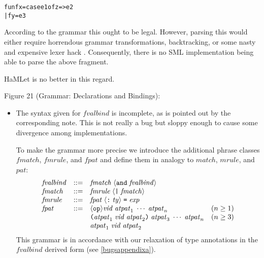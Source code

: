 \documentclass[twoside,titlepage]{article}
\begin{document}
\begin{appendix}
\begin{itemize}
\begin{quoting}
\begin{alltt}
fun f x = case e1 of z => e2
  | f y = e3
\end{alltt}
\end{quoting}

According to the grammar this ought to be legal. However, parsing this would either require horrendous grammar transformations, backtracking, or some nasty and expensive lexer hack \cite{mistakes}. Consequently, there is no SML implementation being able to parse the above fragment.

HaMLet is no better in this regard.
\end{itemize}


Figure 21 (Grammar: Declarations and Bindings):

\begin{itemize}
\item The syntax given for $\mathit{fvalbind}$ is incomplete, as is pointed out by the corresponding note. This is not really a bug but sloppy enough to cause some divergence among implementations.

To make the grammar more precise we introduce the additional phrase classes $\mathit{fmatch}$, $\mathit{fmrule}$, and $\mathit{fpat}$ and define them in analogy to $\mathit{match}$, $\mathit{mrule}$, and $\mathit{pat}$:
%
\begin{displaymath}
\begin{array}{lcll}
\mathit{fvalbind} &::=& \mathit{fmatch} \;
	\langle{\tt{and}} \; \mathit{fvalbind}\rangle \\
\mathit{fmatch} &::=& \mathit{fmrule} \;
	\langle\mbox{\tt|} \; \mathit{fmatch}\rangle \\
\mathit{fmrule} &::=& \mathit{fpat} \;
	\langle\mbox{\tt:} \; \mathit{ty}\rangle \; \mbox{\tt=} \; \mathit{exp} \\
\mathit{fpat} &::=& \langle{\tt{op}}\rangle \mathit{vid} \;
	\mathit{atpat}_1 \; \cdots \; \mathit{atpat}_n & (n\geq1) \\
&& \mbox{\tt(}\mathit{atpat}_1 \; \mathit{vid} \; \mathit{atpat}_2\mbox{\tt)} \;
	\mathit{atpat}_3 \; \cdots \; \mathit{atpat}_n & (n\geq3) \\
&& \mathit{atpat}_1 \; \mathit{vid} \; \mathit{atpat}_2
\end{array}
\end{displaymath}
%
This grammar is in accordance with our relaxation of type annotations in the $\mathit{fvalbind}$ derived form (see \ref{bugsappendixa}).
\end{itemize}



\end{appendix}
\end{document}
